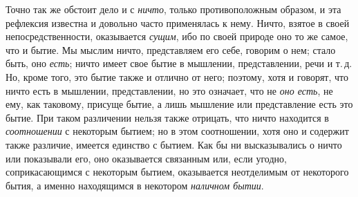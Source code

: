Точно так же обстоит дело и с \emph{ничто}, только противоположным
образом, и эта рефлексия известна и довольно
часто применялась к нему. Ничто, взятое в своей непосредственности,
оказывается \emph{сущим}, ибо по своей природе
оно то же самое, что и бытие. Мы мыслим ничто, представляем
его себе, говорим о нем; стало быть, оно \emph{есть};
ничто имеет свое бытие в мышлении, представлении,
речи и т.\,д. Но, кроме того, это бытие также и отлично
от него; поэтому, хотя и говорят, что ничто есть в мышлении,
представлении, но это означает, что не \emph{оно есть}, не
ему, как таковому, присуще бытие, а лишь мышление или
представление есть это бытие. При таком различении
нельзя также отрицать, что ничто находится в \emph{соотношении}
с некоторым бытием; но в этом соотношении, хотя оно
и содержит также различие, имеется единство с бытием.
Как бы ни высказывались о ничто или показывали его,
оно оказывается связанным или, если угодно, соприкасающимся
с некоторым бытием, оказывается неотделимым
от некоторого бытия, а именно находящимся в некотором
\emph{наличном бытии}.

